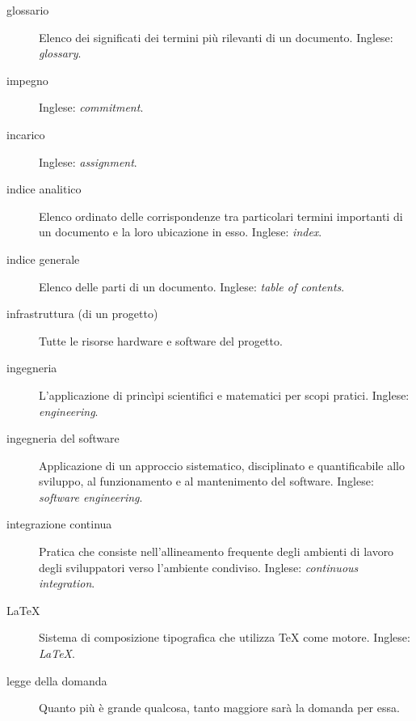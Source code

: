 \documentclass[a4paper]{article}
\begin{document}
\begin{description}
	\item[glossario] 

			Elenco dei significati dei termini più rilevanti di un documento. Inglese: \emph{glossary}.
			
	\item[impegno] 

			 Inglese: \emph{commitment}.
			
	\item[incarico] 

			 Inglese: \emph{assignment}.
			
	\item[indice analitico] 

			Elenco ordinato delle corrispondenze tra particolari termini importanti di un documento e la loro ubicazione in esso. Inglese: \emph{index}.
			
	\item[indice generale] 

			Elenco delle parti di un documento. Inglese: \emph{table of contents}.
			
	\item[infrastruttura (di un progetto)] 

			Tutte le risorse hardware e software del progetto.
			
	\item[ingegneria] 

			L'applicazione di princìpi scientifici e matematici per scopi pratici. Inglese: \emph{engineering}.
			
	\item[ingegneria del software] 

			Applicazione di un approccio sistematico, disciplinato e quantificabile allo sviluppo, al funzionamento e al mantenimento del software. Inglese: \emph{software engineering}.
			
	\item[integrazione continua] 

			Pratica che consiste nell'allineamento frequente degli ambienti di lavoro degli sviluppatori verso l'ambiente condiviso. Inglese: \emph{continuous integration}.
			
	\item[LaTeX] 

			Sistema di composizione tipografica che utilizza TeX come motore. Inglese: \emph{LaTeX}.
			
	\item[legge della domanda] 

			Quanto più è grande qualcosa, tanto maggiore sarà la domanda per essa.
			

\end{description}
\end{document}
